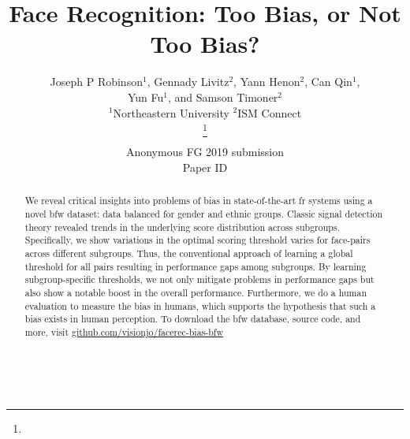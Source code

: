 \documentclass[a4paper, 10pt, conference]{ieeeconf}      %
\title{\LARGE \bf\vspace{-10mm}
Face Recognition: Too Bias, or Not Too Bias?
}
\author{\parbox{16cm}{\centering
    {\large Joseph P Robinson$^1$, Gennady Livitz$^2$, Yann Henon$^2$, Can Qin$^1$,\\ Yun Fu$^1$, and Samson Timoner$^2$}\\
    {\normalsize
    \hspace{-.4in}$^{1}$Northeastern University\hspace{.7in} $^{2}$ISM Connect}}
    \thanks{}%
}
\begin{document}
\begin{bibunit}


\def\angle{0}
\def\radius{3}
\def\cyclelist{{"orange","blue","red","green","magenta","cyan"}}
\newcount\cyclecount {}
\newcount\ind {}

\ifFGfinal
\thispagestyle{empty}
\pagestyle{empty}
\else
\author{Anonymous FG 2019 submission\\ Paper ID \FGPaperID \\}
\pagestyle{plain}
\fi
\maketitle


\begin{abstract}
We reveal critical insights into problems of bias in state-of-the-art \gls{fr} systems using a novel \gls{bfw} dataset: data balanced for gender and ethnic groups. Classic signal detection theory revealed trends in the underlying score distribution across subgroups. Specifically, we show variations in the optimal scoring threshold varies for face-pairs across different subgroups. Thus, the conventional approach of learning a  global threshold for all pairs resulting in performance gaps among subgroups. By learning subgroup-specific thresholds, we not only mitigate problems in performance gaps but also show a notable boost in the overall performance. Furthermore, we do a human evaluation to measure the bias in humans, which supports the hypothesis that such a bias exists in human perception. To download the \gls{bfw} database, source code, and more, visit \href{https://github.com/visionjo/facerec-bias-bfw}{github.com/visionjo/facerec-bias-bfw}
\end{abstract}
\





















\end{bibunit}
\end{document}
